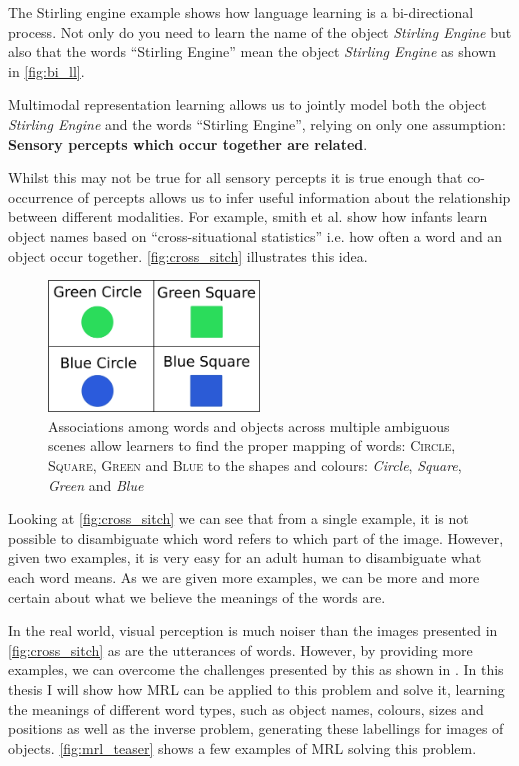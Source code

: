 The Stirling engine example shows how language learning is a bi-directional process. Not only do you need to learn the name of the object \textit{Stirling Engine} but also that the words ``Stirling Engine'' mean the object \textit{Stirling Engine} as shown in \autoref{fig:bi_ll}. 

Multimodal representation learning allows us to jointly model both the object \textit{Stirling Engine} and the words ``Stirling Engine'', relying on only one assumption: \textbf{Sensory percepts which occur together are related}.

Whilst this may not be true for all sensory percepts it is true enough that co-occurrence of percepts allows us to infer useful information about the relationship between different modalities. For example, smith et al. \cite{smith2008infants} show how infants learn object names based on ``cross-situational statistics'' i.e. how often a word and an object occur together. \autoref{fig:cross_sitch} illustrates this idea.

\begin{figure}[h]
\centering
\includegraphics[width=0.5\textwidth]{Figs/introduction/shapes.png}
\caption{Associations among words and objects across multiple ambiguous scenes allow learners to find the proper mapping of words:
\textsc{Circle}, \textsc{Square}, \textsc{Green} and \textsc{Blue} to the shapes and colours: \textit{Circle},  \textit{Square},  \textit{Green} and \textit{Blue}}
\label{fig:cross_sitch}
\end{figure}

Looking at \autoref{fig:cross_sitch} we can see that from a single example, it is not possible to disambiguate which word refers to which part of the image. However, given two examples, it is very easy for an adult human to disambiguate what each word means. As we are given more examples, we can be more and more certain about what we believe the meanings of the words are. 

In the real world, visual perception is much noiser than the images presented in \autoref{fig:cross_sitch} as are the utterances of words. However, by providing more examples, we can overcome the challenges presented by this as shown in \cite{yurovsky2013statistical}. In this thesis I will show how MRL can be applied to this problem and solve it, learning the meanings of different word types, such as object names, colours, sizes and positions as well as the inverse problem, generating these labellings for images of objects. \autoref{fig:mrl_teaser} shows a few examples of MRL solving this problem.

